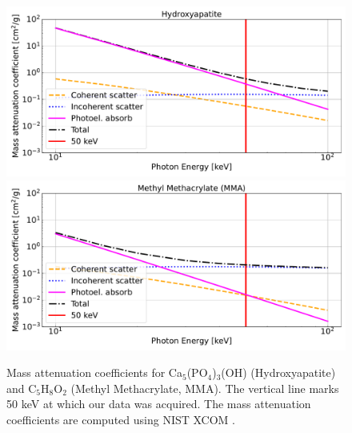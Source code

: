 \begin{figure}
    \centering
    \includegraphics[width=\linewidth]{figures/attenuation_bone.pdf}
    \includegraphics[width=\linewidth]{figures/attenuation_MMA.pdf}
    \caption{Mass attenuation coefficients for Ca$_{5}$(PO$_{4}$)$_{3}$(OH)
	(Hydroxyapatite) and C$_{5}$H$_{8}$O$_{2}$ (Methyl Methacrylate, MMA).
	The vertical line marks 50 keV at which our data was acquired. The mass
	attenuation coefficients are computed using NIST XCOM \cite{NIST-XCOM}.
	}
\label{fig:attenuation}
\end{figure}

